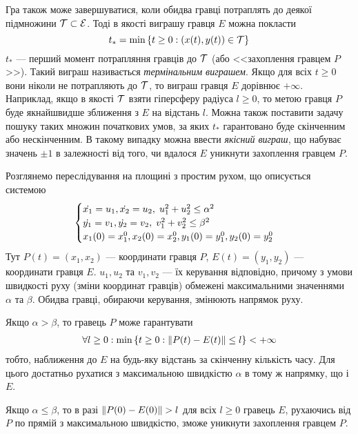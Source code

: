 Гра також може завершуватися, коли обидва гравці потраплять до деякої підмножини $\mathcal{T} \subset \mathcal{E}$.
Тоді в якості виграшу гравця $E$ можна покласти
$$t_* = \min \left\{ t \geq 0 : (x(t), y(t)) \in \mathcal{T}\right\}$$
$t_*$ --- перший момент потрапляння гравців до $\mathcal{T}$ (або <<захоплення гравцем $P$>>).
Такий виграш називається \emph{термінальним виграшем}. Якщо для всіх $t \geq 0$ вони ніколи не потрапляють до $\mathcal{T}$,
то виграш гравця $E$ дорівнює $+\infty$. Наприклад, якщо в якості $\mathcal{T}$ взяти гіперсферу радіуса $l\geq 0$,
то метою гравця $P$ буде якнайшвидше зближення з $E$ на відстань $l$. Можна також поставити задачу пошуку
таких множин початкових умов, за яких $t_*$ гарантовано буде скінченним або нескінченним. 
В такому випадку можна ввести \emph{якісний виграш}, що набуває значень $\pm 1$ в залежності від того,
чи вдалося $E$ уникнути захоплення гравцем $P$.

\begin{example}
    Розглянемо переслідування на площині з простим рухом, що описується системою
    \begin{gather*}
        \begin{cases}
            \dot{x_1} = u_1, \dot{x_2} = u_2, \; u_1^2 + u_2^2 \leq \alpha^2 \\
            \dot{y_1} = v_1, \dot{y_2} = v_2, \; v_1^2 + v_2^2 \leq \beta^2 \\
            x_1(0) = x_1^0, x_2(0) = x_2^0, y_1(0) = y_1^0, y_2(0) = y_2^0
        \end{cases}
    \end{gather*}
    Тут $P(t) = (x_1, x_2)$ --- координати гравця $P$, $E(t) = (y_1, y_2)$ --- координати гравця $E$.
    $u_1, u_2$ та $v_1, v_2$ --- їх керування відповідно, причому з умови швидкості руху (зміни координат гравців) обмежені
    максимальними значеннями $\alpha$ та $\beta$. Обидва гравці, обираючи керування, змінюють напрямок руху.
    
    Якщо $\alpha > \beta$, то гравець $P$ може гарантувати
    \begin{gather*}
        \forall l \geq 0 : \min \left\{ t \geq 0 : \Vert P(t) - E(t) \Vert \leq l\right\} < +\infty
    \end{gather*}
    тобто, наближення до $E$ на будь-яку відстань за скінченну кількість часу.
    Для цього достатньо рухатися з максимальною швидкістю $\alpha$ в тому ж напрямку, що і $E$.

    Якщо $\alpha \leq \beta$, то в разі $\Vert P(0) - E(0) \Vert > l$ для всіх $l \geq 0$ гравець $E$, рухаючись від $P$ по прямій з максимальною швидкістю,
    зможе уникнути захоплення гравцем $P$.
\end{example}


